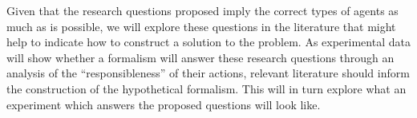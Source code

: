 Given that the research questions proposed imply the correct types of agents as much as is possible, we will explore these questions in the literature that might help to indicate how to construct a solution to the problem. As experimental data will show whether a formalism will answer these research questions through an analysis of the ``responsibleness'' of their actions, relevant literature should inform the construction of the hypothetical formalism. This will in turn explore what an experiment which answers the proposed questions will look like.\par

% 
% 

